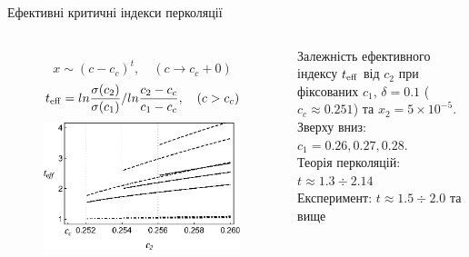 \documentclass[10pt]{beamer}
\begin{document}
\begin{frame}{Ефективні критичні індекси перколяції}
\footnotesize

\vspace{-15pt}
\begin{columns}[T,onlytextwidth]
      \begin{figure}
        \centering
        $$x \sim (c-c_c)^t, \quad (c \to c_c+0)$$
        $$t_{\rm eff} = ln \frac{\sigma(c_2)}{\sigma(c_1)} / ln \frac{c_2-c_c}{c_1 - c_c}, \quad (c>c_c)$$
        \includegraphics[width=0.99\textwidth]{images/teff3.eps}
      \end{figure}
        Залежність ефективного індексу $t_{\rm eff}$ від $c_2$ при фіксованих $c_1$, $\delta=0.1$ ($c_c \approx 0.251$) та $x_2 = 5\times 10^{-5}$. Зверху вниз: $c_1 = 0.26, 0.27, 0.28$.\\
        Теорія перколяцій: $t \approx 1.3 \div 2.14$\\
        Експеримент: $t\approx 1.5 \div 2.0$ та вище


\end{columns}
\end{frame}
\end{document}
